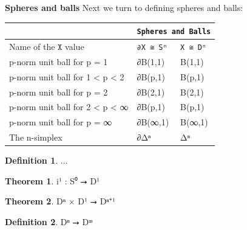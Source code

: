 \documentclass{book}
\theoremstyle{definition}
\newtheorem{definition}{Definition}
\newtheorem{theorem}{Theorem}
\begin{document}

{\bf Spheres and balls} Next we turn to defining spheres and balls:

{
\footnotesize
\begin{center}
\begin{tabular}{||l || l || l ||} 
 \hline
  & \multicolumn{2}{||c||}{\texttt{Spheres and Balls}} \\
 \hline
 Name of the $\texttt{X}$ value & \texttt{∂X ≅ Sⁿ} & \texttt{X ≅ Dⁿ} \\
 \hline
 \hline
 p-norm unit ball for p = 1 & ∂B(1,1) & B(1,1) \\
 \hline
 p-norm unit ball for 1 < p < 2 & ∂B(p,1) & B(p,1) \\
 \hline
 p-norm unit ball for p = 2 & ∂B(2,1) & B(2,1) \\
 \hline
 p-norm unit ball for 2 < p < ∞ & ∂B(p,1) & B(p,1) \\
 \hline
 p-norm unit ball for p = ∞ & ∂B(∞,1) & B(∞,1) \\
 \hline
 The n-simplex & ∂Δⁿ & Δⁿ \\
 \hline
 \hline
\end{tabular}
\end{center}
}

\begin{definition}
...
\end{definition}

\begin{theorem}
i¹ : S⁰ ⭢ D¹ 
\end{theorem}

\begin{theorem}
Dⁿ × D¹ ⭢ Dⁿ⁺¹
\end{theorem}

\begin{definition}
Dⁿ ⭢ Dᵐ
\end{definition}
\end{document}
